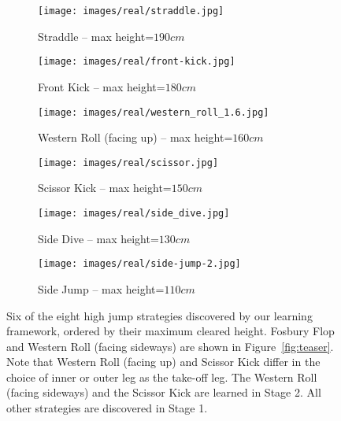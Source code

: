 \begin{figure}
    \centering
    \begin{subfigure}[b]{0.99\linewidth}
        \texttt{[image: images/real/straddle.jpg]}
        \caption{Straddle -- max height=$190cm$}
        \label{fig:highjump-straddle}
    \end{subfigure}
    \begin{subfigure}[b]{0.99\linewidth}
        \texttt{[image: images/real/front-kick.jpg]}
         \caption{Front Kick -- max height=$180cm$}
         \label{fig:highjump-frontkick}
    \end{subfigure}
    \begin{subfigure}[b]{0.99\linewidth}
        \texttt{[image: images/real/western\_roll\_1.6.jpg]}
         \caption{Western Roll (facing up) -- max height=$160cm$}
         \label{fig:highjump-rollup}
    \end{subfigure}
    \begin{subfigure}[b]{0.99\linewidth}
        \texttt{[image: images/real/scissor.jpg]}
         \caption{Scissor Kick -- max height=$150cm$}
         \label{fig:highjump-scissor}
    \end{subfigure}
    \begin{subfigure}[b]{0.99\linewidth}
        \texttt{[image: images/real/side\_dive.jpg]}
         \caption{Side Dive -- max height=$130cm$}
         \label{fig:highjump-sidedive}
    \end{subfigure}
    \begin{subfigure}[b]{0.99\linewidth}
        \texttt{[image: images/real/side-jump-2.jpg]}
         \caption{Side Jump -- max height=$110cm$}
         \label{fig:highjump-sidejump}
    \end{subfigure}
    \caption{Six of the eight high jump strategies discovered by our learning framework, ordered by their maximum cleared height. Fosbury Flop and Western Roll (facing sideways) are shown in Figure~\ref{fig:teaser}. Note that Western Roll (facing up) and Scissor Kick differ in the choice of inner or outer leg as the take-off leg. {The Western Roll (facing sideways) and the Scissor Kick are learned in Stage 2. All other strategies are discovered in Stage 1.}}
    \label{fig:highJumps}
\end{figure}

